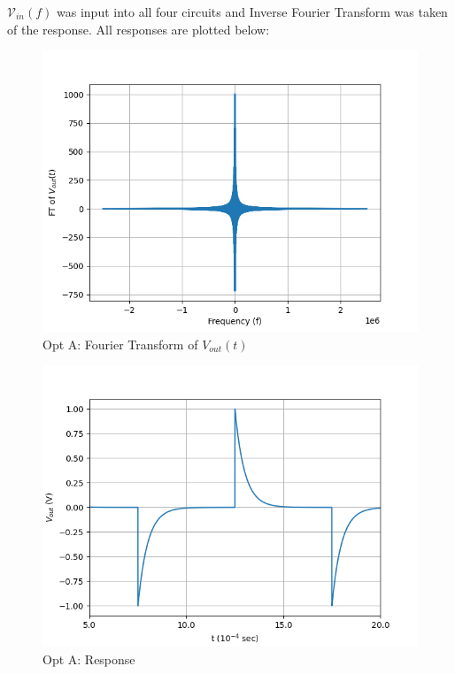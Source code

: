 \documentclass[journal,12pt,twocolumn]{IEEEtran}
\theoremstyle{remark}
\begin{document}
$\mathcal{V}_{in}(f)$ was input into all four circuits and Inverse Fourier Transform was taken of the response. All responses are plotted below:
\begin{figure}[!h]
    \centering
    \includegraphics[width = \columnwidth]{figs/opt_a_ft.png}
    \caption{Opt A: Fourier Transform of $V_{out}(t)$}
    \label{fig:a_ft_gate.ph.23.37}
\end{figure}
\begin{figure}[!h]
    \centering
    \includegraphics[width = \columnwidth]{figs/opt_a_res.png}
    \caption{Opt A: Response}
    \label{fig:a_res_gate.ph.23.37}
\end{figure}
\end{document}
